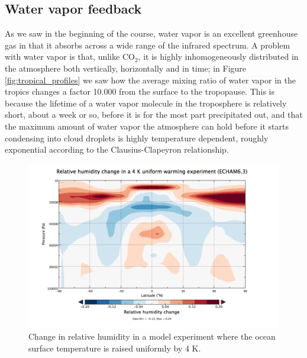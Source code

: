 \documentclass[12pt]{book}
\begin{document}
\subsection{Water vapor feedback}
As we saw in the beginning of the course, water vapor is an excellent greenhouse gas in that it absorbs across a wide range of the infrared spectrum. A problem with water vapor is that, unlike CO$_2$, it is highly inhomogeneously distributed in the atmosphere both vertically, horizontally and in time; in Figure  \ref{fig:tropical_profiles} we saw how the average mixing ratio of water vapor in the tropics changes a factor 10.000 from the surface to the tropopause. This is because the lifetime of a water vapor molecule in the troposphere is relatively short, about a week or so, before it is for the most part precipitated out, and that the maximum amount of water vapor the atmosphere can hold before it starts condensing into cloud droplets is highly temperature dependent, roughly exponential according to the Clausius-Clapeyron relationship. 

\begin{figure}
\begin{center}
\includegraphics[width=14 cm]{../external_figures/RH_change_echam-6_3_02p4_amip4K_zonalmean.png}
\end{center}
\caption{ Change in relative humidity in a model experiment where the ocean surface temperature is raised uniformly by 4 K.} 
\label{fig:RH_change_ECHAM}
\end{figure}
\end{document}
